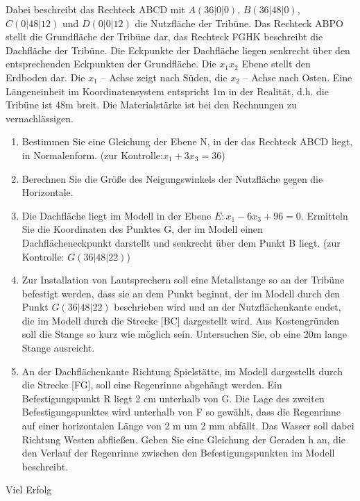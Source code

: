 \documentclass[a4paper,12pt]{article}
\begin{document}
Dabei beschreibt das Rechteck ABCD mit
  $A (36|0|0)$, $ B (36|48|0)$, $C (0|48|12)$ und $ D (0|0|12) $
die Nutzfläche der Tribüne. Das Rechteck ABPO stellt die Grundfläche der Tribüne dar, das
Rechteck FGHK beschreibt die Dachfläche der Tribüne. Die Eckpunkte der Dachfläche liegen
senkrecht über den entsprechenden Eckpunkten der Grundfläche.
Die $x_1x_2 $  Ebene stellt den Erdboden dar. Die $ x_1$ – Achse zeigt nach Süden, die $x_2$ – Achse nach
Osten. Eine Längeneinheit im Koordinatensystem entspricht 1m in der Realität, d.h. die Tribüne ist
48m breit. Die Materialstärke ist bei den Rechnungen zu vernachlässigen.
\begin{enumerate}[label={\alph*)}]
\item  Bestimmen Sie eine Gleichung der Ebene N, in der das Rechteck ABCD liegt, in
Normalenform. (zur Kontrolle:$ x_1 + 3x_3 = 36 $)
\item Berechnen Sie die Größe des Neigungswinkels der Nutzfläche gegen die Horizontale.
\item Die Dachfläche liegt im Modell in der Ebene $E: x_1 - 6x_3 + 96 = 0.$
Ermitteln Sie die Koordinaten des Punktes G, der im Modell einen Dachflächeneckpunkt
darstellt und senkrecht über dem Punkt B liegt. (zur Kontrolle: $G (36|48|22)$)
\item Zur Installation von Lautsprechern soll eine Metallstange so an der Tribüne befestigt
werden, dass sie an dem Punkt beginnt, der im Modell durch den Punkt $G (36|48|22)$  beschrieben wird
und an der Nutzflächenkante endet, die im Modell durch die Strecke [BC] dargestellt wird.
Aus Kostengründen soll die Stange so kurz wie möglich sein. Untersuchen Sie, ob eine 20m
lange Stange ausreicht.
\item An der Dachflächenkante Richtung Spielstätte, im Modell dargestellt durch die Strecke
[FG], soll eine Regenrinne abgehängt werden. Ein Befestigungspunkt R liegt 2 cm
unterhalb von G. Die Lage des zweiten Befestigungspunktes wird unterhalb von F so
gewählt, dass die Regenrinne auf einer horizontalen Länge von 2 m um 2 mm abfällt. Das
Wasser soll dabei Richtung Westen abfließen. Geben Sie eine Gleichung der Geraden h an,
die den Verlauf der Regenrinne zwischen den Befestigungspunkten im Modell beschreibt.
\end{enumerate}
\vspace{0,8cm}


\centerline{Viel Erfolg}
\end{document}
